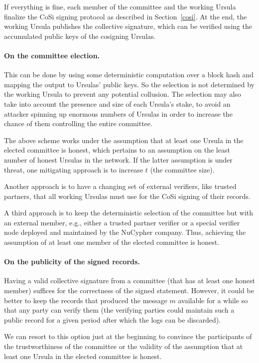 If everything is fine, each member of the committee and the working Ursula finalize the CoSi signing protocol as described in Section~\ref{cosi}. At the end, the working Ursula publishes the collective signature, which can be verified using the accumulated public keys of the cosigning Ursulas.


\paragraph{\bf On the committee election.} 
This can be done by using some deterministic computation over a block hash and mapping the output to Ursulas' public keys. So the selection is not determined by the working Ursula to prevent any potential collusion. The selection may also take into account the presence and size of each Ursula's stake, to avoid an attacker spinning up enormous numbers of Ursulas in order to increase the chance of them controlling the entire committee.


The above scheme works under the assumption that at least one Ursula in the elected committee is honest, which pertains to an assumption on the least number of honest Ursulas in the network. If the latter assumption is under threat, one mitigating approach is to increase $t$ (the committee size).


Another approach is to have a changing set of external verifiers, like trusted partners, that all working Ursulas must use for the CoSi signing of their records.


A third approach is to keep the deterministic selection of the committee but with an external member, e.g., either a trusted partner verifier or a special verifier node deployed and maintained by the NuCypher company. Thus, achieving the assumption of at least one member of the elected committee is honest.


\paragraph{\bf On the publicity of the signed records.} 
Having a valid collective signature from a committee (that has at least one honest member) suffices for the correctness of the signed statement. However, it could be better to keep the records that produced the message $m$  available for a while so that any party can verify them (the verifying parties could maintain such a public record for a given period after which the logs can be discarded). 


We can resort to this option just at the beginning to convince the participants of the trustworthiness of the committee or the validity of the assumption that at least one Ursula in the elected committee is honest.


